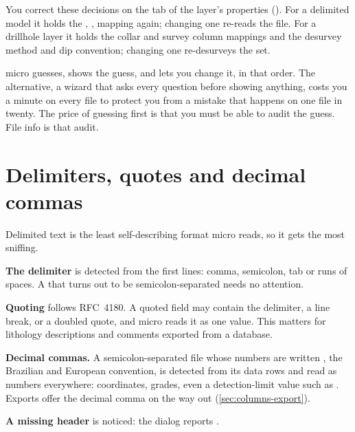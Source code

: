 
You correct these decisions on the  tab of the layer's properties (). For a delimited model it holds the , ,  mapping again; changing one re-reads the file. For a drillhole layer it holds the collar and survey column mappings and the desurvey method and dip convention; changing one re-desurveys the set.

\begin{why}
micro guesses, shows the guess, and lets you change it, in that order. The alternative, a wizard that asks every question before showing anything, costs you a minute on every file to protect you from a mistake that happens on one file in twenty. The price of guessing first is that you must be able to audit the guess. File info is that audit.
\end{why}

\section{Delimiters, quotes and decimal commas}\label{sec:opening-delimited}

Delimited text is the least self-describing format micro reads, so it gets the most sniffing.

\textbf{The delimiter} is detected from the first lines: comma, semicolon, tab or runs of spaces. A  that turns out to be semicolon-separated needs no attention.

\textbf{Quoting} follows RFC~4180. A quoted field may contain the delimiter, a line break, or a doubled quote, and micro reads it as one value. This matters for lithology descriptions and comments exported from a database.

\textbf{Decimal commas.} A semicolon-separated file whose numbers are written , the Brazilian and European convention, is detected from its data rows and read as numbers everywhere: coordinates, grades, even a detection-limit value such as . Exports offer the decimal comma on the way out (\cref{sec:columns-export}).

\textbf{A missing header} is noticed: the dialog reports .

